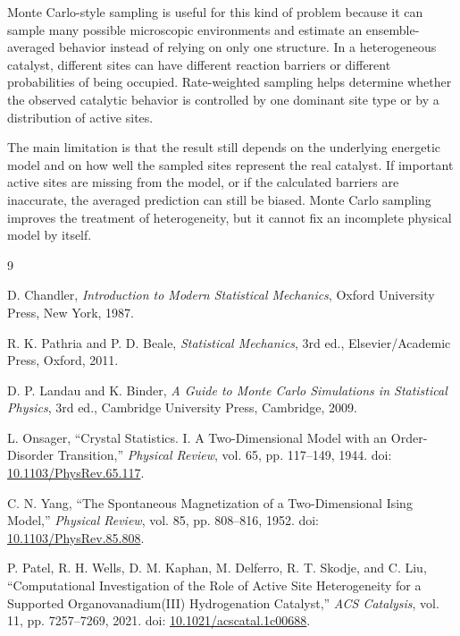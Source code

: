\documentclass[11pt]{article}
\begin{document}
Monte Carlo-style sampling is useful for this kind of problem because it can sample many possible microscopic environments and estimate an ensemble-averaged behavior instead of relying on only one structure. In a heterogeneous catalyst, different sites can have different reaction barriers or different probabilities of being occupied. Rate-weighted sampling helps determine whether the observed catalytic behavior is controlled by one dominant site type or by a distribution of active sites.

The main limitation is that the result still depends on the underlying energetic model and on how well the sampled sites represent the real catalyst. If important active sites are missing from the model, or if the calculated barriers are inaccurate, the averaged prediction can still be biased. Monte Carlo sampling improves the treatment of heterogeneity, but it cannot fix an incomplete physical model by itself.

\begin{thebibliography}{9}

D. Chandler,
\textit{Introduction to Modern Statistical Mechanics},
Oxford University Press, New York, 1987.

R. K. Pathria and P. D. Beale,
\textit{Statistical Mechanics}, 3rd ed.,
Elsevier/Academic Press, Oxford, 2011.

D. P. Landau and K. Binder,
\textit{A Guide to Monte Carlo Simulations in Statistical Physics}, 3rd ed.,
Cambridge University Press, Cambridge, 2009.

L. Onsager,
``Crystal Statistics. I. A Two-Dimensional Model with an Order-Disorder Transition,''
\textit{Physical Review}, vol. 65, pp. 117--149, 1944.
doi: \href{https://doi.org/10.1103/PhysRev.65.117}{10.1103/PhysRev.65.117}.

C. N. Yang,
``The Spontaneous Magnetization of a Two-Dimensional Ising Model,''
\textit{Physical Review}, vol. 85, pp. 808--816, 1952.
doi: \href{https://doi.org/10.1103/PhysRev.85.808}{10.1103/PhysRev.85.808}.

P. Patel, R. H. Wells, D. M. Kaphan, M. Delferro, R. T. Skodje, and C. Liu,
``Computational Investigation of the Role of Active Site Heterogeneity for a Supported Organovanadium(III) Hydrogenation Catalyst,''
\textit{ACS Catalysis}, vol. 11, pp. 7257--7269, 2021.
doi: \href{https://doi.org/10.1021/acscatal.1c00688}{10.1021/acscatal.1c00688}.

\end{thebibliography}
\end{document}
